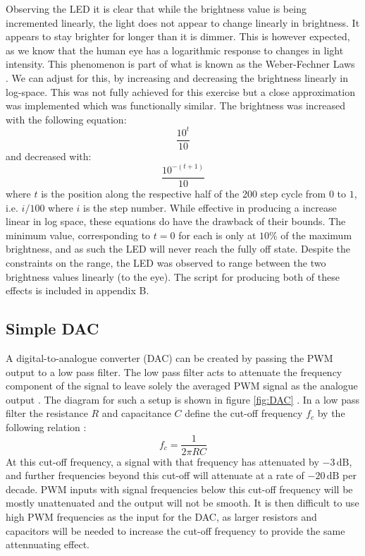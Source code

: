 \documentclass[%
 reprint,
 amsmath,amssymb,
 aps,
]{revtex4-2}
\begin{document}
    Observing the LED it is clear that while the brightness value is being incremented linearly, the light does not appear to change linearly in brightness. It appears to stay brighter for longer than it is dimmer. This is however expected, as we know that the human eye has a logarithmic response to changes in light intensity. This phenomenon is part of what is known as the Weber-Fechner Laws \cite{maes_2021}. We can adjust for this, by increasing and decreasing the brightness linearly in log-space. This was not fully achieved for this exercise but a close approximation was implemented which was functionally similar. The brightness was increased with the following equation:
    \begin{equation}
        \frac{10^{t}}{10}
    \end{equation}and decreased with:
    \begin{equation}
        \frac{10^{-(t+1)}}{10}
    \end{equation}where $t$ is the position along the respective half of the 200 step cycle from $0$ to $1$, i.e. $i/100$ where $i$ is the step number. While effective in producing a increase linear in log space, these equations do have the drawback of their bounds. The minimum value, corresponding to $t=0$ for each is only at $10$\% of the maximum brightness, and as such the LED will never reach the fully off state. Despite the constraints on the range, the LED was observed to range between the two brightness values linearly (to the eye). The script for producing both of these effects is included in appendix B.

    
    \subsection{Simple DAC}
    A digital-to-analogue converter (DAC) can be created by passing the PWM output to a low pass filter. The low pass filter acts to attenuate the frequency component of the signal to leave solely the averaged PWM signal as the analogue output \cite{ucd}. The diagram for such a setup is shown in figure \ref{fig:DAC} \cite{ucd}. In a low pass filter the resistance $R$ and capacitance $C$ define the cut-off frequency $f_c$ by the following relation \cite{horowitz}:
    \begin{equation}
        f_c = \frac{1}{2\pi R C}
    \end{equation}At this cut-off frequency, a signal with that frequency has attenuated by $-3 \,\text{dB}$, and further frequencies beyond this cut-off will attenuate at a rate of $-20\,\text{dB}$ per decade. PWM inputs with signal frequencies below this cut-off frequency will be mostly unattenuated and the output will not be smooth. It is then difficult to use high PWM frequencies as the input for the DAC, as larger resistors and capacitors will be needed to increase the cut-off frequency to provide the same attennuating effect.\\
\end{document}
